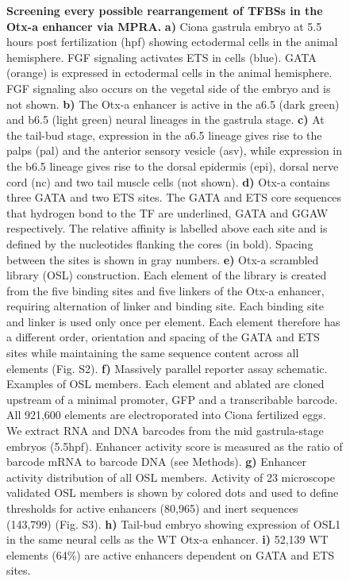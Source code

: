 \begin{figure}[p]
    \caption[Screening every possible rearrangement of TFBSs in the Otx-a enhancer via MPRA.]{\textbf{Screening every possible rearrangement of TFBSs in the Otx-a enhancer via MPRA.} \textbf{a)} Ciona gastrula embryo at 5.5 hours post fertilization (hpf) showing ectodermal cells in the animal hemisphere. FGF signaling activates ETS in cells (blue). GATA (orange) is expressed in ectodermal cells in the animal hemisphere. FGF signaling also occurs on the vegetal side of the embryo and is not shown. \textbf{b)} The Otx-a enhancer is active in the a6.5 (dark green) and b6.5 (light green) neural lineages in the gastrula stage. \textbf{c)} At the tail-bud stage, expression in the a6.5 lineage gives rise to the palps (pal) and the anterior sensory vesicle (asv), while expression in the b6.5 lineage gives rise to the dorsal epidermis (epi), dorsal nerve cord (nc) and two tail muscle cells (not shown). \textbf{d)} Otx-a contains three GATA and two ETS sites. The GATA and ETS core sequences that hydrogen bond to the TF are underlined, GATA and GGAW respectively. The relative affinity is labelled above each site and is defined by the nucleotides flanking the cores (in bold). Spacing between the sites is shown in gray numbers. \textbf{e)} Otx-a scrambled library (OSL) construction. Each element of the library is created from the five binding sites and five linkers of the Otx-a enhancer, requiring alternation of linker and binding site. Each binding site and linker is used only once per element. Each element therefore has a different order, orientation and spacing of the GATA and ETS sites while maintaining the same sequence content across all elements (Fig. S2). \textbf{f)} Massively parallel reporter assay schematic. Examples of OSL members. Each element and ablated are cloned upstream of a minimal promoter, GFP and a transcribable barcode. All 921,600 elements are electroporated into Ciona fertilized eggs. We extract RNA and DNA barcodes from the mid gastrula-stage embryos (5.5hpf). Enhancer activity score is measured as the ratio of barcode mRNA to barcode DNA (see Methods). \textbf{g)} Enhancer activity distribution of all OSL members. Activity of 23 microscope validated OSL members is shown by colored dots and used to define thresholds for active enhancers (80,965) and inert sequences (143,799) (Fig. S3). \textbf{h)} Tail-bud embryo showing expression of OSL1 in the same neural cells as the WT Otx-a enhancer. \textbf{i)} 52,139 WT elements (64\%) are active enhancers dependent on GATA and ETS sites.}
    \label{fig:2 Figure 1}
\end{figure}

